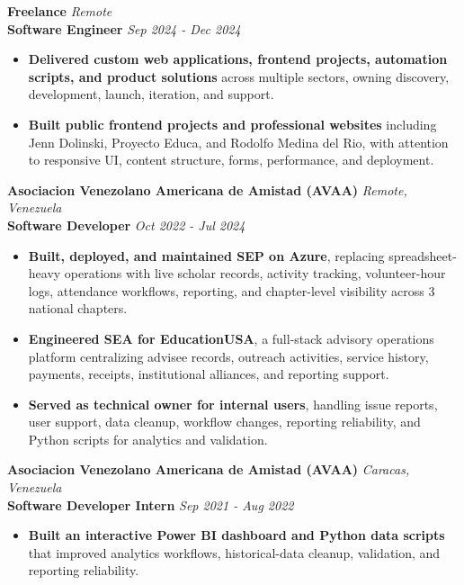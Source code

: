 \documentclass[10pt]{article}
\begin{document}
\vspace{5pt}
\textbf{Freelance} \hfill \textit{Remote} \\
\textbf{Software Engineer} \hfill \textit{Sep 2024 - Dec 2024}
\begin{itemize}
    \item \textbf{Delivered custom web applications, frontend projects, automation scripts, and product solutions} across multiple sectors, owning discovery, development, launch, iteration, and support.
    \item \textbf{Built public frontend projects and professional websites} including Jenn Dolinski, Proyecto Educa, and Rodolfo Medina del Rio, with attention to responsive UI, content structure, forms, performance, and deployment.
\end{itemize}

\newpage

\vspace{5pt}
\textbf{Asociacion Venezolano Americana de Amistad (AVAA)} \hfill \textit{Remote, Venezuela} \\
\textbf{Software Developer} \hfill \textit{Oct 2022 - Jul 2024}
\begin{itemize}
    \item \textbf{Built, deployed, and maintained SEP on Azure}, replacing spreadsheet-heavy operations with live scholar records, activity tracking, volunteer-hour logs, attendance workflows, reporting, and chapter-level visibility across 3 national chapters.
    \item \textbf{Engineered SEA for EducationUSA}, a full-stack advisory operations platform centralizing advisee records, outreach activities, service history, payments, receipts, institutional alliances, and reporting support.
    \item \textbf{Served as technical owner for internal users}, handling issue reports, user support, data cleanup, workflow changes, reporting reliability, and Python scripts for analytics and validation.
\end{itemize}

\vspace{5pt}
\textbf{Asociacion Venezolano Americana de Amistad (AVAA)} \hfill \textit{Caracas, Venezuela} \\
\textbf{Software Developer Intern} \hfill \textit{Sep 2021 - Aug 2022}
\begin{itemize}
    \item \textbf{Built an interactive Power BI dashboard and Python data scripts} that improved analytics workflows, historical-data cleanup, validation, and reporting reliability.
\end{itemize}
\end{document}
